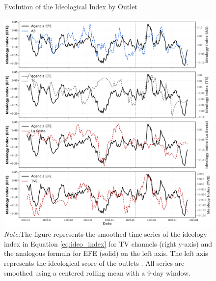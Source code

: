\documentclass[12pt]{article}
\begin{document}
	
	\begin{figure}[!htb]
		\caption{Evolution of the Ideological Index by Outlet}
		\centering
		\includegraphics[width=150mm]{figures/tv_vs_efe_net_diff_by_channel}
		\caption*{\small \textit{Note:}The figure represents the smoothed time series of the ideology index in Equation \eqref{eq:ideo_index} for TV channels (right y-axis) and the analogous formula for  EFE (solid) on the left axis. The left axis represents the ideological score of the outlets . All series are smoothed using a centered rolling mean with a 9-day window.}
		\label{fig:net_tone_by_channel}
	\end{figure}
	
	
	
\end{document}
